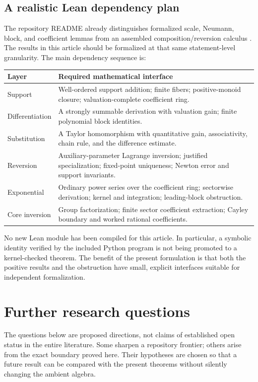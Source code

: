 \documentclass[11pt,a4paper]{article}
\theoremstyle{definition}
\theoremstyle{remark}
\begin{document}
\subsection{A realistic Lean dependency plan}
The repository README already distinguishes formalized scale, Neumann,
block, and coefficient lemmas from an assembled composition/reversion
calculus \cite{ProveItReadme}. The results in this article should be
formalized at that same statement-level granularity. The main dependency
sequence is:
\begin{center}
\begin{tabular}{@{}p{}p{}@{}}
\toprule
Layer & Required mathematical interface\\
\midrule
Support & Well-ordered support addition; finite fibers; positive-monoid
closure; valuation-complete coefficient ring.\\[0.35em]
Differentiation & A strongly summable derivation with valuation gain;
finite polynomial block identities.\\[0.35em]
Substitution & A Taylor homomorphism with quantitative gain, associativity,
chain rule, and the difference estimate.\\[0.35em]
Reversion & Auxiliary-parameter Lagrange inversion; justified specialization;
fixed-point uniqueness; Newton error and support invariants.\\[0.35em]
Exponential & Ordinary power series over the coefficient ring; sectorwise
derivation; kernel and integration; leading-block obstruction.\\[0.35em]
Core inversion & Group factorization; finite sector coefficient extraction;
Cayley boundary and worked rational coefficients.\\
\bottomrule
\end{tabular}
\end{center}
No new Lean module has been compiled for this article. In particular, a
symbolic identity verified by the included Python program is not being
promoted to a kernel-checked theorem. The benefit of the present formulation
is that both the positive results and the obstruction have small, explicit
interfaces suitable for independent formalization.

\section{Further research questions}
\label{sec:questions}

The questions below are proposed directions, not claims of established open
status in the entire literature. Some sharpen a repository frontier; others
arise from the exact boundary proved here. Their hypotheses are chosen so
that a future result can be compared with the present theorems without
silently changing the ambient algebra.
\end{document}
